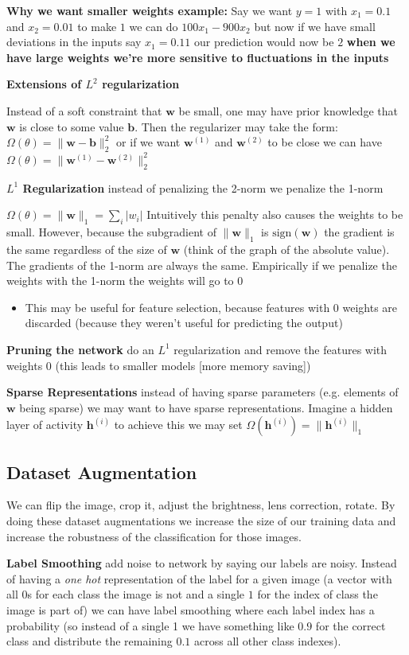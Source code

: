 \documentclass[twocolumn, letter, 10pt, landscape]{article}
\newcommand{\mb}{\mathbf}
\newcommand{\tb}{\textbf}
\newcommand{\ti}{\textit}
\newcommand{\bit}{\vspace{-0.1in}\begin{itemize}\setlength\itemsep{-0.05in}}
\newcommand{\eit}{\end{itemize}\vspace{-0.1in}}
\begin{document}
\tb{Why we want smaller weights example:} Say we want $y=1$ with $x_1 = 0.1$ and $x_2 = 0.01$ to make $1$ we can do $100x_1-900x_2$ but now if we have small deviations in the inputs say $x_1=0.11$ our prediction would now be $2$ \tb{when we have large weights we're more sensitive to fluctuations in the inputs}

\tb{Extensions of $L^2$ regularization}

Instead of a soft constraint that $\mb{w}$ be small, one may have prior knowledge that $\mb{w}$ is close to some value $\mb{b}$. Then the regularizer may take the form: $\Omega(\theta)=\|\mb{w}-\mb{b}\|_2^2$ or if we want $\mb{w}^{(1)}$ and $\mb{w}^{(2)}$ to be close we can have $\Omega(\theta)=\|\mb{w}^{(1)}-\mb{w}^{(2)}\|_2^2$

\tb{$L^1$ Regularization} instead of penalizing the 2-norm we penalize the 1-norm

$\Omega(\theta)=\|\mb{w}\|_1 = \sum_i|w_i|$ Intuitively this penalty also causes the weights to be small. However, because the subgradient of $\|\mb{w}\|_1$ is $\text{sign}(\mb{w})$ the gradient is the same regardless of the size of $\mb{w}$ (think of the graph of the absolute value). The gradients of the 1-norm are always the same. Empirically if we penalize the weights with the 1-norm the weights will go to $0$

\bit{}
\item This may be useful for feature selection, because features with $0$ weights are discarded (because they weren't useful for predicting the output)
\eit{}

\tb{Pruning the network} do an $L^1$ regularization and remove the features with weights $0$ (this leads to smaller models [more memory saving])

\tb{Sparse Representations} instead of having sparse parameters (e.g. elements of $\mb{w}$ being sparse) we may want to have sparse representations. Imagine a hidden layer of activity $\mb{h}^{(i)}$ to achieve this we may set $\Omega(\mb{h}^{(i)})=\|\mb{h}^{(i)}\|_1$

\subsection{Dataset Augmentation}
We can flip the image, crop it, adjust the brightness, lens correction, rotate. By doing these dataset augmentations we increase the size of our training data and increase the robustness of the classification for those images.

\tb{Label Smoothing} add noise to network by saying our labels are noisy. Instead of having a \ti{one hot} representation of the label for a given image (a vector with all $0$s for each class the image is not and a single $1$ for the index of class the image is part of) we can have label smoothing where each label index has a probability (so instead of a single 1 we have something like $0.9$ for the correct class and distribute the remaining $0.1$ across all other class indexes).
\end{document}
